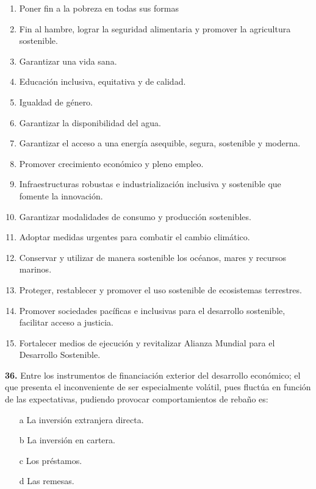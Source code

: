 \documentclass{nuevotema}
\begin{document}
\begin{enumerate}
	\item Poner fin a la pobreza en todas sus formas
	\item Fin al hambre, lograr la seguridad alimentaria y promover la agricultura sostenible.
	\item Garantizar una vida sana.
	\item Educación inclusiva, equitativa y de calidad.
	\item Igualdad de género.
	\item Garantizar la disponibilidad del agua.
	\item Garantizar el acceso a una energía asequible, segura, sostenible y moderna.
	\item Promover crecimiento económico y pleno empleo.
	\item Infraestructuras robustas e industrialización inclusiva y sostenible que fomente la innovación.
	\item Garantizar modalidades de consumo y producción sostenibles.
	\item Adoptar medidas urgentes para combatir el cambio climático.
	\item Conservar y utilizar de manera sostenible los océanos, mares y recursos marinos.
	\item Proteger, restablecer y promover el uso sostenible de ecosistemas terrestres.
	\item Promover sociedades pacíficas e inclusivas para el desarrollo sostenible, facilitar acceso a justicia.
	\item Fortalecer medios de ejecución y revitalizar Alianza Mundial para el Desarrollo Sostenible.
\end{enumerate}

\preguntas


\textbf{36.} Entre los instrumentos de financiación exterior del desarrollo económico; el que presenta el inconveniente de ser especialmente volátil, pues fluctúa en función de las expectativas, pudiendo provocar comportamientos de rebaño es:

\begin{itemize}
	\item[a] La inversión extranjera directa.
	\item[b] La inversión en cartera.
	\item[c] Los préstamos.
	\item[d] Las remesas.
\end{itemize}
\end{document}
